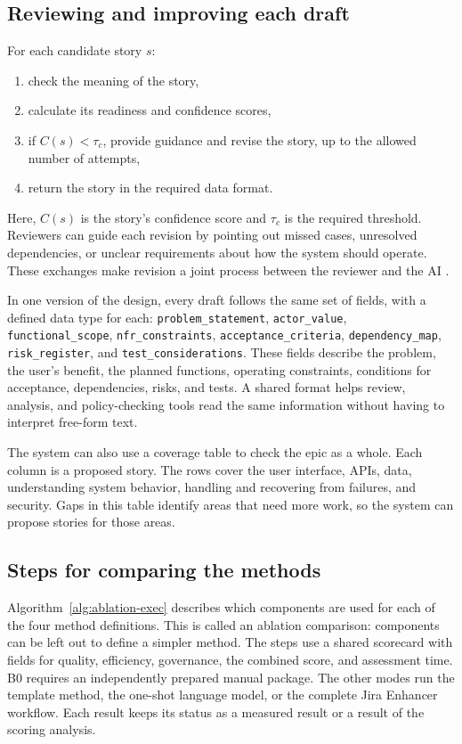 \documentclass[10pt,a4paper]{article}
\begin{document}
\subsection{Reviewing and improving each draft}
For each candidate story $s$:
\begin{enumerate}
  \item check the meaning of the story,
  \item calculate its readiness and confidence scores,
  \item if $C(s)<\tau_c$, provide guidance and revise the story, up to the allowed number of attempts,
  \item return the story in the required data format.
\end{enumerate}
Here, $C(s)$ is the story's confidence score and $\tau_c$ is the required threshold. Reviewers can guide each revision by pointing out missed cases, unresolved dependencies, or unclear requirements about how the system should operate. These exchanges make revision a joint process between the reviewer and the AI \citep{R56,R57}.

In one version of the design, every draft follows the same set of fields, with a defined data type for each:
\texttt{problem\_statement}, \texttt{actor\_value}, \texttt{functional\_scope}, \texttt{nfr\_constraints}, \texttt{acceptance\_criteria},
\texttt{dependency\_map}, \texttt{risk\_register}, and \texttt{test\_considerations}. These fields describe the problem, the user's benefit, the planned functions, operating constraints, conditions for acceptance, dependencies, risks, and tests. A shared format helps review, analysis, and policy-checking tools read the same information without having to interpret free-form text.

The system can also use a coverage table to check the epic as a whole. Each column is a proposed story. The rows cover the user interface, APIs, data, understanding system behavior, handling and recovering from failures, and security. Gaps in this table identify areas that need more work, so the system can propose stories for those areas.

\subsection{Steps for comparing the methods}
Algorithm~\ref{alg:ablation-exec} describes which components are used for each of the four method definitions. This is called an ablation comparison: components can be left out to define a simpler method. The steps use a shared scorecard with fields for quality, efficiency, governance, the combined score, and assessment time. B0 requires an independently prepared manual package. The other modes run the template method, the one-shot language model, or the complete Jira Enhancer workflow. Each result keeps its status as a measured result or a result of the scoring analysis.
\end{document}
